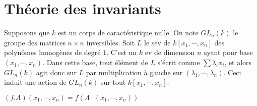     \section{Théorie des invariants}
        Supposons que $k$ est un corps de caractéristique nulle. On note $GL_n(k)$ le groupe des matrices $n \times n$ inversibles. Soit $L$ le sev de $k[x_1, \cdots, x_n]$ des polynômes homogènes de degré $1$. C'est un $k$ ev de dimension $n$ ayant pour base $(x_1, \cdots, x_n)$. Dans cette base, tout élément de $L$ s'écrit comme $\sum \lambda_ix_i$, et alors $GL_n(k)$ agit donc sur $L$ par multiplication à gauche sur $(\lambda_1, \cdots, \lambda_n)$. Ceci induit une action de $GL_n(k)$ sur tout $k[x_1, \cdots, x_n]$.
        \begin{nota}
            $(f.A)(x_1, \cdots, x_n) = f(A \cdot (x_1, \cdots, x_n))$
        \end{nota}